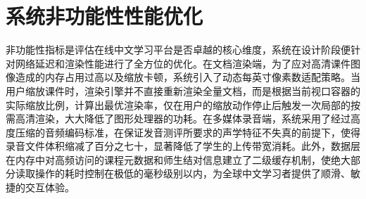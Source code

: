 \section{系统非功能性性能优化}
非功能性指标是评估在线中文学习平台是否卓越的核心维度，系统在设计阶段便针对网络延迟和渲染性能进行了全方位的优化。在文档渲染端，为了应对高清课件图像造成的内存占用过高以及缩放卡顿，系统引入了动态每英寸像素数适配策略。当用户缩放课件时，渲染引擎并不直接重新渲染全量文档，而是根据当前视口容器的实际缩放比例，计算出最优渲染率，仅在用户的缩放动作停止后触发一次局部的按需高清渲染，大大降低了图形处理器的功耗。在多媒体录音端，系统采用了经过高度压缩的音频编码标准，在保证发音测评所要求的声学特征不失真的前提下，使得录音文件体积缩减了百分之七十，显著降低了学生的上传带宽消耗。此外，数据层在内存中对高频访问的课程元数据和师生结对信息建立了二级缓存机制，使绝大部分读取操作的耗时控制在极低的毫秒级别以内，为全球中文学习者提供了顺滑、敏捷的交互体验。
